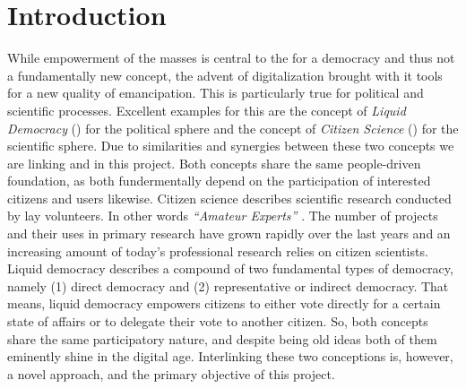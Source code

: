 \chapter{Introduction}
\label{ch:Introduction}


While empowerment of the masses is central to the for a democracy and thus not a fundamentally new concept, the advent of digitalization brought with it tools for a new quality of emancipation. This is particularly true for political and scientific processes. Excellent examples for this are the concept of \textit{Liquid Democracy} () for the political sphere and the concept of \textit{Citizen Science} () for the scientific sphere. Due to similarities and synergies between these two concepts we are linking  and  in this project. Both concepts share the same people-driven foundation, as both fundermentally depend on the participation of interested citizens and users likewise. Citizen science describes scientific research conducted by lay volunteers. In other words \textit{“Amateur Experts”}  \parencite{Gura2013}. The number of  projects and their uses in primary research have grown rapidly over the last years \parencite{Kosmala2016} and an increasing amount of today’s professional research relies on citizen scientists. Liquid democracy describes a compound of two fundamental types of democracy, namely (1) direct democracy and (2) representative or indirect democracy. That means, liquid democracy empowers citizens to either vote directly for a certain state of affairs or to  delegate their vote to another citizen. So, both concepts share the same participatory nature, and despite being old ideas both of them eminently shine in the digital age. Interlinking these two conceptions is, however, a novel approach, and the primary objective of this project.



